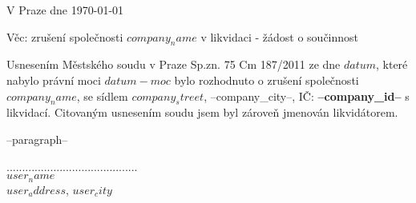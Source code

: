 \documentclass{../static/myletter}
\begin{document}
\begin{letter}{}
\opening{V Praze dne \today}
    Věc: zrušení společnosti \textbf{$company_name$} v likvidaci - žádost o součinnost                  

Usnesením Městského soudu v Praze Sp.zn. 75 Cm 187/2011 ze dne $datum$, které nabylo právní moci $datum-moc$ bylo rozhodnuto o zrušení společnosti $company_name$, se sídlem $company_street$, --company_city--,  IČ: \textbf{--company_id--} s likvidací. Citovaným usnesením soudu jsem byl zároveň jmenován likvidátorem.  

--paragraph--

\hspace*{5cm}

\closing{..........................................\\ $user_name$ \\ $user_address$, $user_city$}
\end{letter}
\end{document}

